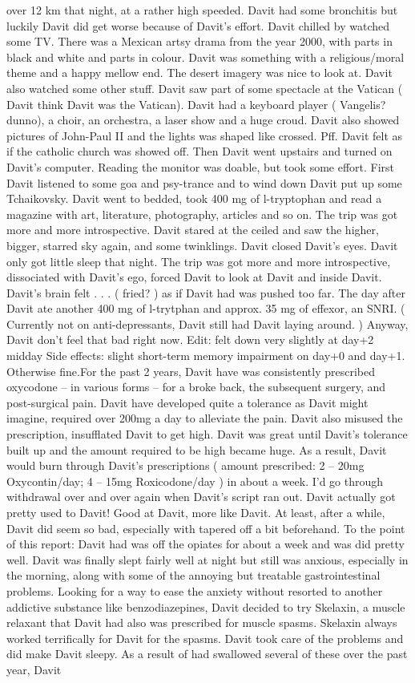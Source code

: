 \documentclass[12pt]{book}
\begin{document}
over 12 km that night, at a rather high speeded. Davit had some bronchitis but luckily Davit did get worse because of Davit's effort. Davit chilled by watched some TV. There was a Mexican artsy drama from the year 2000, with parts in black and white and parts in colour. Davit was something with a religious/moral theme and a happy mellow end. The desert imagery was nice to look at. Davit also watched some other stuff. Davit saw part of some spectacle at the Vatican ( Davit think Davit was the Vatican). Davit had a keyboard player ( Vangelis? dunno), a choir, an orchestra, a laser show and a huge croud. Davit also showed pictures of John-Paul II and the lights was shaped like crossed. Pff. Davit felt as if the catholic church was showed off. Then Davit went upstairs and turned on Davit's computer. Reading the monitor was doable, but took some effort. First Davit listened to some goa and psy-trance and to wind down Davit put up some Tchaikovsky. Davit went to bedded, took 400 mg of l-tryptophan and read a magazine with art, literature, photography, articles and so on. The trip was got more and more introspective. Davit stared at the ceiled and saw the higher, bigger, starred sky again, and some twinklings. Davit closed Davit's eyes. Davit only got little sleep that night. The trip was got more and more introspective, dissociated with Davit's ego, forced Davit to look at Davit and inside Davit. Davit's brain felt  . . .  ( fried? ) as if Davit had was pushed too far. The day after Davit ate another 400 mg of l-trytphan and approx. 35 mg of effexor, an SNRI. ( Currently not on anti-depressants, Davit still had Davit laying around. ) Anyway, Davit don't feel that bad right now. Edit: felt down very slightly at day+2 midday Side effects: slight short-term memory impairment on day+0 and day+1. Otherwise fine.For the past 2 years, Davit have was consistently prescribed oxycodone -- in various forms -- for a broke back, the subsequent surgery, and post-surgical pain. Davit have developed quite a tolerance as Davit might imagine, required over 200mg a day to alleviate the pain. Davit also misused the prescription, insufflated Davit to get high. Davit was great until Davit's tolerance built up and the amount required to be high became huge. As a result, Davit would burn through Davit's prescriptions ( amount prescribed: 2 -- 20mg Oxycontin/day; 4 -- 15mg Roxicodone/day ) in about a week. I'd go through withdrawal over and over again when Davit's script ran out. Davit actually got pretty used to Davit! Good at Davit, more like Davit. At least, after a while, Davit did seem so bad, especially with tapered off a bit beforehand. To the point of this report: Davit had was off the opiates for about a week and was did pretty well. Davit was finally slept fairly well at night but still was anxious, especially in the morning, along with some of the annoying but treatable gastrointestinal problems. Looking for a way to ease the anxiety without resorted to another addictive substance like benzodiazepines, Davit decided to try Skelaxin, a muscle relaxant that Davit had also was prescribed for muscle spasms. Skelaxin always worked terrifically for Davit for the spasms. Davit took care of the problems and did make Davit sleepy. As a result of had swallowed several of these over the past year, Davit 
\end{document}
